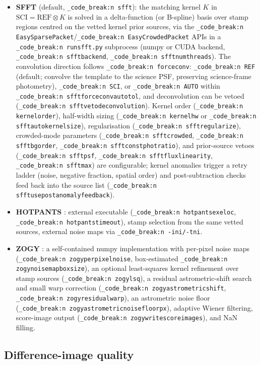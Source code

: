 \documentclass[11pt,a4paper]{article}
\renewcommand{\_}{\autophotunderscore\allowbreak}
\DeclareRobustCommand{\code}[1]{\texttt{\autophot_code_break:n {#1}}}
\begin{document}
\begin{itemize}[leftmargin=1.6em,itemsep=1pt]
\item \textbf{SFFT} \citep{hu2022sfft,russell2022sfft} (default,
  \code{sfft}): the matching kernel $K$ in
  $\mathrm{SCI}=\mathrm{REF}\otimes K$ is solved in a delta-function
  (or B-spline) basis \citep{alard1998method} over stamp regions centred
  on the vetted kernel
  prior sources, via the \code{Easy\_SparsePacket}\slash\code{Easy\_CrowdedPacket}
  APIs in a \code{run\_sfft.py} subprocess (numpy or CUDA backend,
  \code{sfft\_backend}, \code{sfft\_num\_threads}). The convolution
  direction follows \code{forceconv}: \code{REF} (default; convolve the
  template to the science PSF, preserving science-frame photometry),
  \code{SCI}, or \code{AUTO} within
  \code{sfft\_forceconv\_auto\_tol}, and deconvolution can be vetoed
  (\code{sfft\_veto\_deconvolution}). Kernel order
  (\code{kernel\_order}), half-width sizing
  (\code{kernel\_hw\_*} or \code{sfft\_auto\_kernel\_size}),
  regularisation (\code{sfft\_regularize\_*}), crowded-mode parameters
  (\code{sfft\_crowded\_*}, \code{sfft\_bg\_order},
  \code{sfft\_const\_phot\_ratio}), and prior-source vetoes
  (\code{sfft\_psf\_*}, \code{sfft\_flux\_linearity\_*},
  \code{sfft\_max\_*}) are configurable; kernel anomalies trigger a retry
  ladder (noise, negative fraction, spatial order) and post-subtraction
  checks feed back into the source list
  (\code{sfft\_use\_post\_anomaly\_feedback}).
\item \textbf{HOTPANTS} \citep{becker2015hotpants}: external executable
  (\code{hotpants\_exe\_loc}, \code{hotpants\_timeout}), stamp selection
  from the same vetted sources, external noise maps via \code{-ini/-tni}.
\item \textbf{ZOGY} \citep{zackay2016proper}: a self-contained numpy
  implementation with per-pixel noise maps
  (\code{zogy\_per\_pixel\_noise}, box-estimated
  \code{zogy\_noise\_map\_box\_size}), an optional least-squares kernel
  refinement over stamp sources (\code{zogy\_lsq\_*}), a residual
  astrometric-shift search and small warp correction
  (\code{zogy\_astrometric\_shift}, \code{zogy\_residual\_warp}), an
  astrometric noise floor (\code{zogy\_astrometric\_noise\_floor\_px}),
  adaptive Wiener filtering, score-image output
  (\code{zogy\_write\_score\_images}), and NaN filling.
\end{itemize}

\subsection{Difference-image quality}
\end{document}

